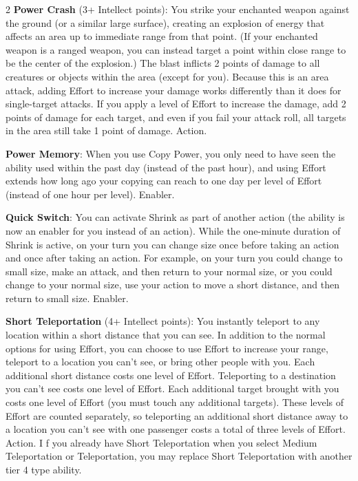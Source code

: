 \begin{multicols}{2}
\textbf{Power Crash} (3+ Intellect points): You strike your enchanted weapon against
the ground (or a similar large surface), creating an explosion of energy that affects an area up to immediate range from that point. (If your enchanted weapon is a ranged weapon, you can instead target a point within close range to be the center of the explosion.) The blast inflicts 2 points of damage to all creatures or objects within the area (except for you). Because this is an area attack, adding Effort to increase your damage works differently than it does for single-target attacks. If you apply a level of Effort to increase the damage, add 2 points of damage for each target, and even if you fail your attack roll, all targets in the area still take 1 point of damage. Action.

\textbf{Power Memory}: When you use Copy Power, you only need to have seen the ability used within the past day (instead of the past hour), and using Effort extends how long ago your copying can reach to one day per level of Effort (instead of one hour per level). Enabler.

\textbf{Quick Switch}: You can activate Shrink as part of another action (the ability is now an enabler for you instead of an action). While the one-minute duration of Shrink is active, on your turn you can change size once before taking an action and once after taking an action. For example, on your turn you could change to small size, make an attack, and then return to your normal size, or you could change to your normal size, use your action to move a short distance, and then return to small size. Enabler.

\textbf{Short Teleportation} (4+ Intellect points): You instantly teleport to any location within a short distance that you can see. In addition to the normal options for using Effort, you can choose to use Effort to increase your range, teleport to a location you can’t see, or bring other people with you. Each additional short distance costs one level of Effort. Teleporting to a destination you can’t see costs one level of Effort. Each additional target brought with you costs one level of Effort (you must touch any additional targets). These levels of Effort are counted separately, so teleporting an additional short distance away to a location you can’t see with one passenger costs a total of three levels of Effort. Action.
I
f you already have Short Teleportation when you select Medium Teleportation or Teleportation, you may replace Short Teleportation with another tier 4 type ability.


\end{multicols}
